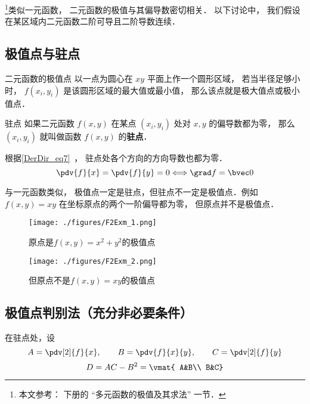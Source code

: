 

\footnote{本文参考： \cite{同济高} 下册的 “多元函数的极值及其求法” 一节．}类似一元函数， 二元函数的极值与其偏导数密切相关． 以下讨论中， 我们假设在某区域内二元函数二阶可导且二阶导数连续．

\subsection{极值点与驻点}
\begin{definition}{二元函数的极值点}
以一点为圆心在 $xy$ 平面上作一个圆形区域， 若当半径足够小时， $f(x_i, y_i)$ 是该圆形区域的最大值或最小值， 那么该点就是极大值点或极小值点． 
\end{definition}

\begin{definition}{驻点}
如果二元函数 $f(x,y)$ 在某点 $(x_i, y_i)$ 处对 $x, y$ 的偏导数都为零， 那么 $(x_i, y_i)$ 就叫做函数 $f(x,y)$ 的\textbf{驻点}． 
\end{definition}
根据\autoref{DerDir_eq7}~， 驻点处各个方向的方向导数也都为零．
\begin{equation}
\pdv{f}{x}=\pdv{f}{y}=0 \Longleftrightarrow \grad f=\bvec0
\end{equation}

与一元函数类似， 极值点一定是驻点，但驻点不一定是极值点．例如 $f(x,y) = xy$ 在坐标原点的两个一阶偏导都为零， 但原点并不是极值点． 

\begin{figure}[ht]
\centering
\texttt{[image: ./figures/F2Exm\_1.png]}
\caption{原点是$f(x,y)=x^2+y^2$的极值点} \label{F2Exm_fig1}
\end{figure}


\begin{figure}[ht]
\centering
\texttt{[image: ./figures/F2Exm\_2.png]}
\caption{但原点不是$f(x,y)=xy$的极值点} \label{F2Exm_fig2}
\end{figure}

\subsection{极值点判别法（充分非必要条件）}
在驻点处，设
\begin{equation}
A=\pdv[2]{f}{x},\qquad B=\pdv{f}{x}{y},\qquad C=\pdv[2]{f}{y}
\end{equation}
\begin{equation}
D=AC-B^2=
\vmat{
A&B\\
B&C}
\end{equation}


